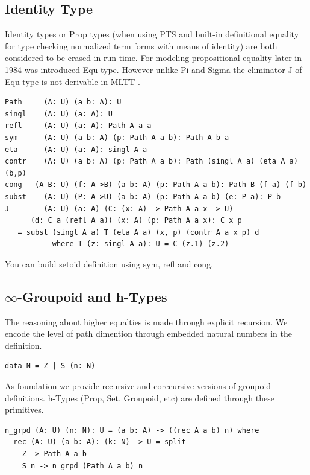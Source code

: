 \documentclass{article}
\begin{document}
\subsection{Identity Type}

Identity types or Prop types (when using PTS and built-in definitional equality for type checking
normalized term forms with means of identity) are both considered to be erased in run-time.
For modeling propositional equality later in 1984 was introduced Equ type. \cite{Lof84}
However unlike Pi and Sigma the eliminator J of Equ type is
not derivable in MLTT \cite{Hofmann96, Mortberg17, HoTT}.

\begin{lstlisting}[mathescape=true]
Path     (A: U) (a b: A): U
singl    (A: U) (a: A): U
refl     (A: U) (a: A): Path A a a
sym      (A: U) (a b: A) (p: Path A a b): Path A b a
eta      (A: U) (a: A): singl A a
contr    (A: U) (a b: A) (p: Path A a b): Path (singl A a) (eta A a) (b,p)
cong   (A B: U) (f: A->B) (a b: A) (p: Path A a b): Path B (f a) (f b)
subst    (A: U) (P: A->U) (a b: A) (p: Path A a b) (e: P a): P b
J        (A: U) (a: A) (C: (x: A) -> Path A a x -> U)
      (d: C a (refl A a)) (x: A) (p: Path A a x): C x p
   = subst (singl A a) T (eta A a) (x, p) (contr A a x p) d
           where T (z: singl A a): U = C (z.1) (z.2)
\end{lstlisting}

You can build setoid \cite{Bishop67} definition using sym, refl and cong.

\subsection{$\infty$-Groupoid and h-Types}

The reasoning about higher equalties is made through explicit recursion.
We encode the level of path dimention through embedded natural numbers in the definition.

\begin{lstlisting}[mathescape=true]
data N = Z | S (n: N)
\end{lstlisting}

As foundation we provide recursive and corecursive versions of groupoid definitions.
h-Types \cite{HoTT} (Prop, Set, Groupoid, etc) are defined through these primitives.

\begin{lstlisting}[mathescape=true]
n_grpd (A: U) (n: N): U = (a b: A) -> ((rec A a b) n) where
  rec (A: U) (a b: A): (k: N) -> U = split
    Z -> Path A a b
    S n -> n_grpd (Path A a b) n
\end{lstlisting}
\end{document}
